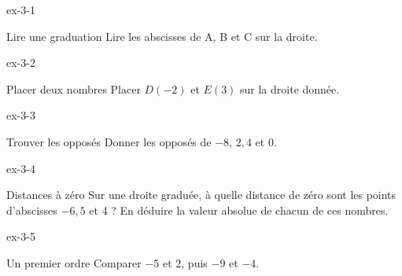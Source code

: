 \clearpage{}
\begin{blocLivre}{ex-3-1}\begin{exercice}[1]{Lire une graduation}
Lire les abscisses de A, B et C sur la droite.
\label{fig-ex-3-1}
\end{exercice}\end{blocLivre}
\begin{blocLivre}{ex-3-2}\begin{exercice}[1]{Placer deux nombres}
Placer $D(-2)$ et $E(3)$ sur la droite donnée.
\label{fig-ex-3-2}
\end{exercice}\end{blocLivre}
\begin{blocLivre}{ex-3-3}\begin{exercice}[1]{Trouver les opposés}
Donner les opposés de $-8$, $2{,}4$ et 0.
\end{exercice}\end{blocLivre}
\begin{blocLivre}{ex-3-4}\begin{exercice}[1]{Distances à zéro}
Sur une droite graduée, à quelle distance de zéro sont les points d’abscisses $-6{,}5$ et 4 ? En déduire la valeur absolue de chacun de ces nombres.
\end{exercice}\end{blocLivre}
\begin{blocLivre}{ex-3-5}\begin{exercice}[1]{Un premier ordre}
Comparer $-5$ et 2, puis $-9$ et $-4$.
\end{exercice}\end{blocLivre}

